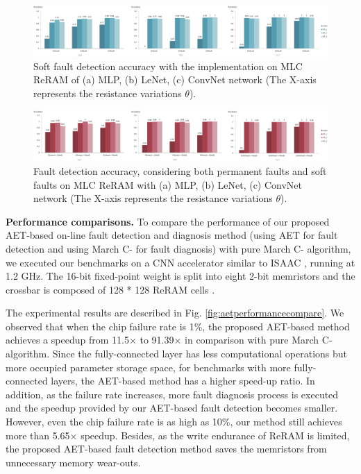 \begin{figure}
    \centering
    \includegraphics[width=0.75\linewidth]{images/OL-fig12}
    \caption{Soft fault detection accuracy with the implementation on MLC ReRAM of (a) MLP, (b) LeNet, (c) ConvNet network (The X-axis represents the resistance variations $\theta$).}
    \label{fig:mlc-soft}
    \vspace{-20pt}
\end{figure}


\begin{figure}[t]
    \centering
    \includegraphics[width=0.75\linewidth]{images/OL-fig13}
    \caption{Fault detection accuracy, considering both permanent faults and soft faults on MLC ReRAM with (a) MLP, (b) LeNet, (c) ConvNet network (The X-axis represents the resistance variations $\theta$).}
    \label{fig:mlc-hard-soft}
\end{figure}


{\bf Performance comparisons.} To compare the performance of our proposed AET-based on-line fault detection and diagnosis method (using AET for fault detection and using March C- for fault diagnosis) with pure March C- algorithm, we executed our benchmarks on a CNN accelerator similar to ISAAC \cite{7551379}, running at 1.2 GHz. The 16-bit fixed-point weight is split into eight 2-bit memristors and the crossbar is composed of 128 * 128  ReRAM cells \cite{Xiangyu2011}. 

The experimental results are described in Fig. \ref{fig:aetperformancecompare}. We observed that when the chip failure rate is 1\%, the proposed AET-based method achieves a speedup from 11.5$\times$ to 91.39$\times$ in comparison with pure March C- algorithm. Since the fully-connected layer has less computational operations but more occupied parameter storage space, for benchmarks with more fully-connected layers, the AET-based method has a higher speed-up ratio. In addition, as the failure rate increases, more fault diagnosis process is executed and the speedup provided by our AET-based fault detection becomes smaller. However, even the chip failure rate is as high as 10\%, our method still achieves more than 5.65$\times$ speedup. Besides, as the write endurance of ReRAM is limited, the proposed AET-based fault detection method saves the memristors from unnecessary memory wear-outs.


